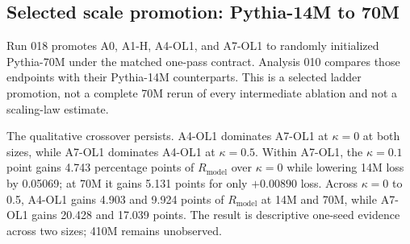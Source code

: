 \documentclass[10pt,a4paper]{article}
\newcommand{\Rmodel}{\ensuremath{R_{\mathrm{model}}}}
\begin{document}
\subsection{Selected scale promotion: Pythia-14M to 70M}

Run 018 promotes A0, A1-H, A4-OL1, and A7-OL1 to randomly initialized Pythia-70M under the matched one-pass contract. Analysis 010 compares those endpoints with their Pythia-14M counterparts. This is a selected ladder promotion, not a complete 70M rerun of every intermediate ablation and not a scaling-law estimate.

The qualitative crossover persists. A4-OL1 dominates A7-OL1 at $\kappa=0$ at both sizes, while A7-OL1 dominates A4-OL1 at $\kappa=0.5$. Within A7-OL1, the $\kappa=0.1$ point gains 4.743 percentage points of \Rmodel{} over $\kappa=0$ while lowering 14M loss by 0.05069; at 70M it gains 5.131 points for only $+0.00890$ loss. Across $\kappa=0$ to 0.5, A4-OL1 gains 4.903 and 9.924 points of \Rmodel{} at 14M and 70M, while A7-OL1 gains 20.428 and 17.039 points. The result is descriptive one-seed evidence across two sizes; 410M remains unobserved.
\end{document}
